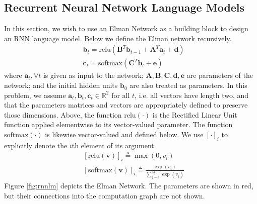 \documentclass[11pt,addpoints,answers]{exam}
\numberwithin{equation}{section} %
\numberwithin{figure}{section} %
\numberwithin{table}{section} %
\newcommand{\Rb}{\mathbb{R}}
\newcommand{\av}{\mathbf{a}}
\newcommand{\bv}{\mathbf{b}}
\newcommand{\cv}{\mathbf{c}}
\newcommand{\dv}{\mathbf{d}}
\newcommand{\ev}{\mathbf{e}}
\newcommand{\vv}{\mathbf{v}}
\newcommand{\Av}{\mathbf{A}}
\newcommand{\Bv}{\mathbf{B}}
\newcommand{\Cv}{\mathbf{C}}
\begin{document}
\begin{questions}
\begin{parts}

\end{parts}
\end{questions}

\clearpage
\subsection{Recurrent Neural Network Language Models}


In this section, we wish to use an Elman Network as a building block to design an RNN language model. Below we define the Elman network recursively.
%
\begin{align*}
& \bv_t = \text{relu}( \Bv^T \bv_{t-1} + \Av^T \av_t + \dv ) \\
& \cv_t = \text{softmax}( \Cv^T \bv_t + \ev)
\end{align*}
%
where $\av_t, \forall t$ is given as input to the network; $\Av, \Bv, \Cv, \dv, \ev$ are parameters of the network; and the initial hidden units $\bv_0$ are also treated as parameters. In this problem, we assume $\av_t, \bv_t, \cv_t \in \Rb^2$ for all $t$, i.e. all vectors have length two, and that the parameters matrices and vectors are appropriately defined to preserve those dimensions. Above, the function $\text{relu}(\cdot)$ is the Rectified Linear Unit function applied elementwise to its vector-valued parameter. The function $\text{softmax}(\cdot)$ is likewise vector-valued and defined below. We use $[\cdot]_i$ to explicitly denote the $i$th element of its argument.
%
\begin{align*}
& [\text{relu}(\vv)]_i \triangleq \max(0, v_i) \\
& [\text{softmax}(\vv)]_i \triangleq \frac{ \exp(v_i) }{ \sum_{j=1}^M \exp(v_j) }
\end{align*}
%
Figure \ref{fig:rnnlm} depicts the Elman Network. The parameters are shown in red, but their connections into the computation graph are not shown.
\end{document}
